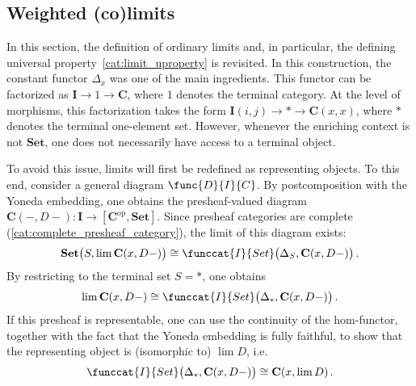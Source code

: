 \subsection{Weighted (co)limits}\label{section:weighted_limits}

    In this section, the definition of ordinary limits and, in particular, the defining universal property~\ref{cat:limit_uproperty} is revisited. In this construction, the constant functor $\Delta_x$ was one of the main ingredients. This functor can be factorized as $\mathbf{I}\rightarrow1\rightarrow\mathbf{C}$, where $1$ denotes the terminal category. At the level of morphisms, this factorization takes the form $\mathbf{I}(i,j)\rightarrow\ast\rightarrow\mathbf{C}(x,x)$, where $\ast$ denotes the terminal one-element set. However, whenever the enriching context is not $\mathbf{Set}$, one does not necessarily have access to a terminal object.

    To avoid this issue, limits will first be redefined as representing objects. To this end, consider a general diagram $\func{D}{I}{C}$. By postcomposition with the Yoneda embedding, one obtains the presheaf-valued diagram $\mathbf{C}(-,D-):\mathbf{I}\rightarrow[\mathbf{C}^{\text{op}},\mathbf{Set}]$. Since presheaf categories are complete (\cref{cat:complete_presheaf_category}), the limit of this diagram exists:
    \begin{gather}
        \mathbf{Set}\bigl(S,\lim\mathbf{C}(x,D-)\bigr)\cong\funccat{I}{Set}\bigl(\Delta_S,\mathbf{C}(x,D-)\bigr)\,.
    \end{gather}
    By restricting to the terminal set $S=\ast$, one obtains
    \begin{gather}
        \lim\mathbf{C}(x,D-)\cong\funccat{I}{Set}\bigl(\Delta_\ast,\mathbf{C}(x,D-)\bigr)\,.
    \end{gather}
    If this presheaf is representable, one can use the continuity of the hom-functor, together with the fact that the Yoneda embedding is fully faithful, to show that the representing object is (isomorphic to) $\lim D$, i.e.
    \begin{gather}
        \funccat{I}{Set}\bigl(\Delta_\ast,\mathbf{C}(x,D-)\bigr)\cong\mathbf{C}(x,\lim D)\,.
    \end{gather}



